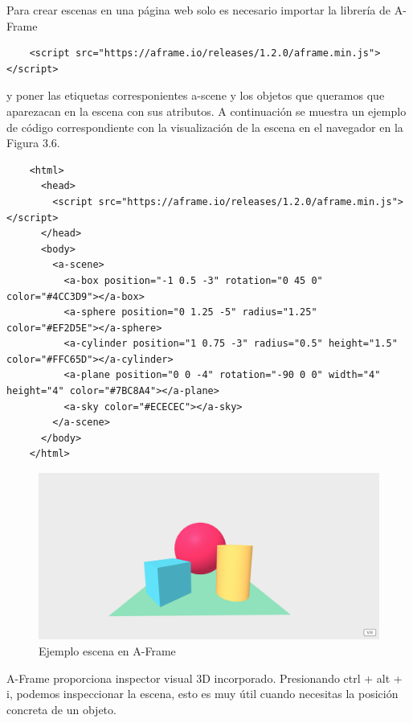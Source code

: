 Para crear escenas en una página web solo es necesario importar la librería de A-Frame \begin{lstlisting}
    <script src="https://aframe.io/releases/1.2.0/aframe.min.js"></script>
\end{lstlisting} 
y poner las etiquetas corresponientes a-scene y los objetos que queramos que aparezacan en la escena con sus atributos.
A continuación se muestra un ejemplo de código correspondiente con la visualización de la escena en el navegador en la Figura 3.6.
\\
\begin{lstlisting}
    <html>
      <head>
        <script src="https://aframe.io/releases/1.2.0/aframe.min.js"></script>
      </head>
      <body>
        <a-scene>
          <a-box position="-1 0.5 -3" rotation="0 45 0" color="#4CC3D9"></a-box>
          <a-sphere position="0 1.25 -5" radius="1.25" color="#EF2D5E"></a-sphere>
          <a-cylinder position="1 0.75 -3" radius="0.5" height="1.5" color="#FFC65D"></a-cylinder>
          <a-plane position="0 0 -4" rotation="-90 0 0" width="4" height="4" color="#7BC8A4"></a-plane>
          <a-sky color="#ECECEC"></a-sky>
        </a-scene>
      </body>
    </html>
\end{lstlisting}

\begin{figure}[H]
    \centering
    \includegraphics[width=1\textwidth, height=0.5\textwidth]{chapters/images/aframe.png}
    \caption{Ejemplo escena en A-Frame}
    \label{fig:my_label}
\end{figure}

A-Frame proporciona inspector visual 3D incorporado. Presionando ctrl + alt + i, podemos inspeccionar la escena, esto es muy útil cuando necesitas la posición concreta de un objeto.

